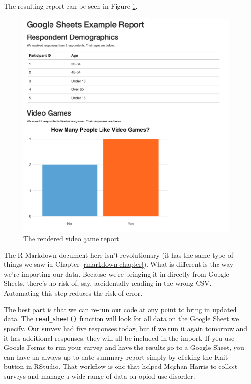 \documentclass[
]{book}
\begin{document}
The resulting report can be seen in Figure \ref{fig:video-game-report}.

\begin{figure}
\includegraphics[width=1\linewidth]{assets/video-game-report} \caption{The rendered video game report}\label{fig:video-game-report}
\end{figure}

The R Markdown document here isn't revolutionary (it has the same type of things we saw in Chapter \ref{rmarkdown-chapter}). What is different is the way we're importing our data. Because we're bringing it in directly from Google Sheets, there's no risk of, say, accidentally reading in the wrong CSV. Automating this step reduces the risk of error.

The best part is that we can re-run our code at any point to bring in updated data. The \texttt{read\_sheet()} function will look for all data on the Google Sheet we specify. Our survey had five responses today, but if we run it again tomorrow and it has additional responses, they will all be included in the import. If you use Google Forms to run your survey and have the results go to a Google Sheet, you can have an always up-to-date summary report simply by clicking the Knit button in RStudio. That workflow is one that helped Meghan Harris to collect surveys and manage a wide range of data on opiod use disorder.
\end{document}

